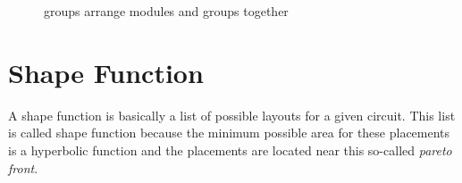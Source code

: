 \begin{figure}
	\centering
	\caption{groups arrange modules and groups together}
	\label{fig:group_of_modules}
\end{figure}

\section{Shape Function}
A shape function is basically a list of possible layouts for a given circuit. This list is called shape function  because the minimum possible area for these placements is a hyperbolic function and the placements are located near this so-called \emph{pareto front}.

